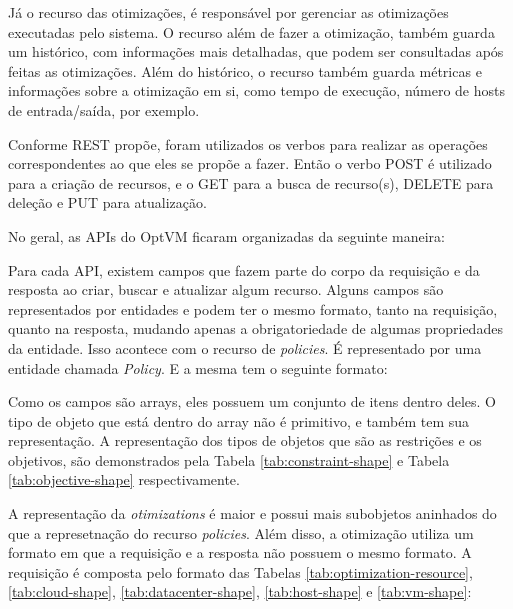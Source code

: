 Já o recurso das otimizações, é responsável por gerenciar as otimizações executadas pelo sistema. O recurso 
além de fazer a otimização, também guarda um histórico, com informações mais detalhadas, 
que podem ser consultadas após feitas as otimizações. Além do histórico, o recurso também guarda métricas e informações sobre
a otimização em si, como tempo de execução, número de hosts de entrada/saída, por exemplo.

Conforme REST propõe, foram utilizados os verbos para realizar as operações correspondentes
ao que eles se propõe a fazer. Então o verbo POST é utilizado para a criação de recursos,
e o GET para a busca de recurso(s), DELETE para deleção e PUT para atualização.

No geral, as APIs do OptVM ficaram organizadas da seguinte maneira:





Para cada API, existem campos que fazem parte do corpo da requisição e da resposta
ao criar, buscar e atualizar algum recurso. Alguns campos são representados por entidades e 
podem ter o mesmo formato, tanto na requisição, quanto na resposta, mudando apenas
a obrigatoriedade de algumas propriedades da entidade. Isso acontece
com o recurso de \textit{policies}. É representado por uma entidade chamada \textit{Policy}.
E a mesma tem o seguinte formato:



Como os campos são arrays, eles possuem um conjunto de itens dentro deles. O tipo
de objeto que está dentro do array não é primitivo, e também tem sua representação.
A representação dos tipos de objetos que são as restrições e os objetivos, são demonstrados
pela Tabela \ref{tab:constraint-shape} e Tabela \ref{tab:objective-shape} respectivamente.




A representação da \textit{otimizations} é maior e possui mais subobjetos aninhados
do que a represetnação do recurso \textit{policies}. Além disso, a otimização utiliza 
um formato em que a requisição e a resposta não possuem o mesmo formato. A requisição
é composta pelo formato das Tabelas \ref{tab:optimization-resource}, \ref{tab:cloud-shape},
\ref{tab:datacenter-shape}, \ref{tab:host-shape} e \ref{tab:vm-shape}:

